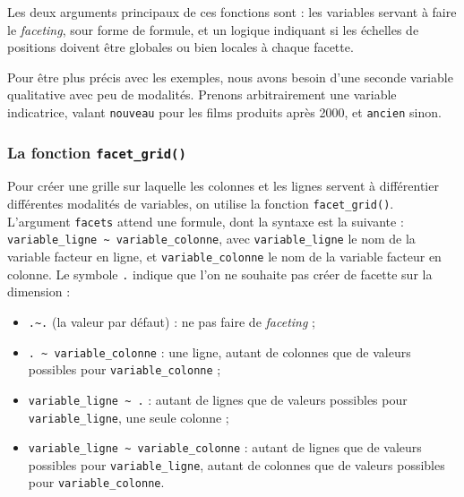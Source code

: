 \documentclass[
  11pt,
]{book}
\newenvironment{Shaded}{\begin{snugshade}}{\end{snugshade}}
\newcommand{\DecValTok}[1]{\textcolor[rgb]{0.00,0.00,0.81}{#1}}
\newcommand{\KeywordTok}[1]{\textcolor[rgb]{0.13,0.29,0.53}{\textbf{#1}}}
\newcommand{\NormalTok}[1]{#1}
\newcommand{\OperatorTok}[1]{\textcolor[rgb]{0.81,0.36,0.00}{\textbf{#1}}}
\newcommand{\StringTok}[1]{\textcolor[rgb]{0.31,0.60,0.02}{#1}}
\providecommand{\tightlist}{%
  \setlength{\itemsep}{0pt}\setlength{\parskip}{0pt}}
\numberwithin{equation}{section}
\numberwithin{countremarque}{section}
\begin{document}
Les deux arguments principaux de ces fonctions sont : les variables servant à faire le \emph{faceting}, sour forme de formule, et un logique indiquant si les échelles de positions doivent être globales ou bien locales à chaque facette.

Pour être plus précis avec les exemples, nous avons besoin d'une seconde variable qualitative avec peu de modalités. Prenons arbitrairement une variable indicatrice, valant \texttt{nouveau} pour les films produits après 2000, et \texttt{ancien} sinon.

\begin{Shaded}
\end{Shaded}

\hypertarget{graphiques_ggplot_facet_grid}{%
\subsubsection{\texorpdfstring{La fonction \texttt{facet\_grid()}}{La fonction facet\_grid()}}\label{graphiques_ggplot_facet_grid}}

Pour créer une grille sur laquelle les colonnes et les lignes servent à différentier différentes modalités de variables, on utilise la fonction \texttt{facet\_grid()}. L'argument \texttt{facets} attend une formule, dont la syntaxe est la suivante : \texttt{variable\_ligne\ \textasciitilde{}\ variable\_colonne}, avec \texttt{variable\_ligne} le nom de la variable facteur en ligne, et \texttt{variable\_colonne} le nom de la variable facteur en colonne. Le symbole \texttt{.} indique que l'on ne souhaite pas créer de facette sur la dimension :

\begin{itemize}
\tightlist
\item
  \texttt{.\textasciitilde{}.} (la valeur par défaut) : ne pas faire de \emph{faceting} ;
\item
  \texttt{.\ \textasciitilde{}\ variable\_colonne} : une ligne, autant de colonnes que de valeurs possibles pour \texttt{variable\_colonne} ;
\item
  \texttt{variable\_ligne\ \textasciitilde{}\ .} : autant de lignes que de valeurs possibles pour \texttt{variable\_ligne}, une seule colonne ;
\item
  \texttt{variable\_ligne\ \textasciitilde{}\ variable\_colonne} : autant de lignes que de valeurs possibles pour \texttt{variable\_ligne}, autant de colonnes que de valeurs possibles pour \texttt{variable\_colonne}.
\end{itemize}
\end{document}
